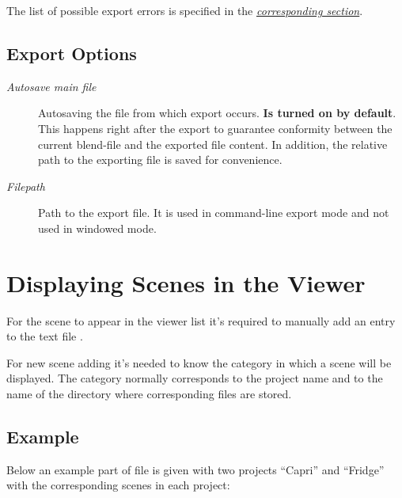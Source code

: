\documentclass[a4paper,12pt,oneside]{sphinxmanual}
\begin{document}
\begin{DUlineblock}{0em}
\item[] 
\end{DUlineblock}

The list of possible export errors is specified in the {\hyperref[addon:export-errors]{\emph{corresponding section}}}.


\subsection{Export Options}
\label{workflow:id4}\begin{description}
\item[{\emph{Autosave main file}}] \leavevmode
Autosaving the file from which export occurs. \textbf{Is turned on by default}. This happens right after the export to guarantee conformity between the current blend-file and the exported file content. In addition, the relative path to the exporting file is saved for convenience.

\item[{\emph{Filepath}}] \leavevmode
Path to the export file. It is used in command-line export mode and not used in windowed mode.

\end{description}


\section{Displaying Scenes in the Viewer}
\label{workflow:id5}\label{workflow:index-1}
For the scene to appear in the viewer list it's required to manually add an entry to the text file .

For new scene adding it's needed to know the category in which a scene will be displayed. The category normally corresponds to the project name and to the name of the directory where corresponding files are stored.


\subsection{Example}
\label{workflow:id6}
Below an example part of  file is given with two projects ``Capri'' and ``Fridge'' with the corresponding scenes in each project:
\end{document}
